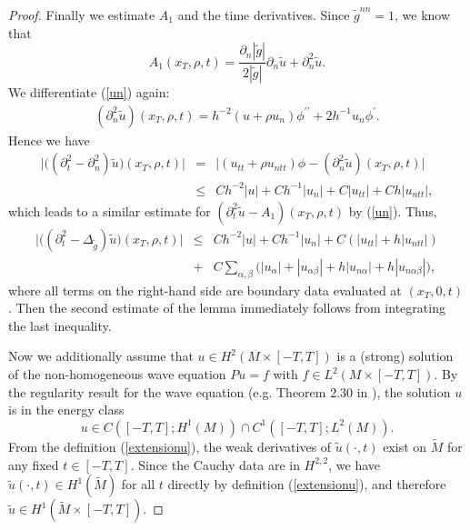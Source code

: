 \documentclass[11pt,letterpaper]{amsart}
\numberwithin{equation}{section}
\theoremstyle{definition}
\theoremstyle{plain}
\theoremstyle{definition}
\theoremstyle{plain}
\theoremstyle{definition}
\theoremstyle{plain}
\begin{document}
\begin{proof}
Finally we estimate $A_1$ and the time derivatives.
Since $\widetilde{g}^{nn}=1$, we know that 
$$A_1(x_T,\rho,t)=\frac{\partial_n |\widetilde{g}|}{2|\widetilde{g}|} \partial_{n}\widetilde{u} +  \partial_{n}^2\widetilde{u}.$$
We differentiate (\ref{un}) again:
\begin{eqnarray*}
(\partial_{n}^2\widetilde{u})(x_T,\rho,t) = h^{-2}(u+\rho u_n)\phi^{\prime\prime}+ 2h^{-1}u_n\phi^{\prime}.
\end{eqnarray*}
Hence we have
\begin{eqnarray*}
\big| \big((\partial_{t}^2 -\partial_{n}^2)\widetilde{u} \big)(x_T,\rho,t)\big|&=&\big| (u_{tt}+\rho u_{ntt})\phi-(\partial_{n}^2\widetilde{u})(x_T,\rho,t) \big|\\
&\leqslant& Ch^{-2}|u|+Ch^{-1}|u_n| +C|u_{tt}|+Ch|u_{ntt}|,
\end{eqnarray*}
which leads to a similar estimate for $(\partial_{t}^2 \widetilde{u}-A_1)(x_T,\rho,t)$ by (\ref{un}). Thus,
\begin{eqnarray*}\label{waveextension}
\big| \big((\partial_{t}^2 -\Delta_{\widetilde{g}})\widetilde{u} \big)(x_T,\rho,t)\big|&\leqslant& Ch^{-2}|u|+Ch^{-1}|u_n| +C(|u_{tt}|+h|u_{ntt}|) \nonumber \\
&+&C\sum_{\alpha,\beta} \big(|u_{\alpha}|+|u_{\alpha\beta}|+h|u_{n\alpha}|+h|u_{n\alpha\beta}| \big),
\end{eqnarray*}
where all terms on the right-hand side are boundary data evaluated at $(x_T,0,t)$. Then the second estimate of the lemma immediately follows from integrating the last inequality.

\smallskip
Now we additionally assume that $u\in H^2(M\times[-T,T])$ is a (strong) solution of the non-homogeneous wave equation $Pu=f$ with $f\in L^2(M\times [-T,T])$. 
By the regularity result for the wave equation (e.g. Theorem 2.30 in \cite{KKL}), the solution $u$ is in the energy class
$$u \in C([-T,T];H^1(M))\cap C^1([-T,T];L^2(M)).$$
From the definition (\ref{extensionu}), the weak derivatives of $\widetilde{u}(\cdot,t)$ exist on $\widetilde{M}$ for any fixed $t\in [-T,T]$. Since the Cauchy data are in $H^{2,2}$, we have $\widetilde{u}(\cdot,t)\in H^1(\widetilde{M})$ for all $t$ directly by definition (\ref{extensionu}), and therefore $\widetilde{u}\in H^1(\widetilde{M}\times [-T,T])$.


\end{proof}
\end{document}
